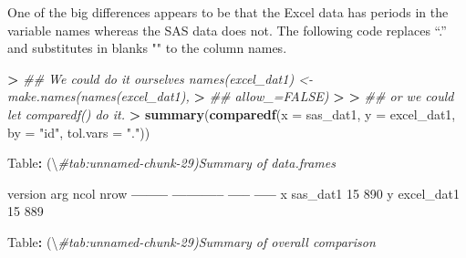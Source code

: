 \documentclass[
]{book}
\newenvironment{Shaded}{\begin{snugshade}}{\end{snugshade}}
\newcommand{\CommentTok}[1]{\textcolor[rgb]{0.56,0.35,0.01}{\textit{#1}}}
\newcommand{\DataTypeTok}[1]{\textcolor[rgb]{0.13,0.29,0.53}{#1}}
\newcommand{\DecValTok}[1]{\textcolor[rgb]{0.00,0.00,0.81}{#1}}
\newcommand{\ErrorTok}[1]{\textcolor[rgb]{0.64,0.00,0.00}{\textbf{#1}}}
\newcommand{\KeywordTok}[1]{\textcolor[rgb]{0.13,0.29,0.53}{\textbf{#1}}}
\newcommand{\NormalTok}[1]{#1}
\newcommand{\OperatorTok}[1]{\textcolor[rgb]{0.81,0.36,0.00}{\textbf{#1}}}
\newcommand{\StringTok}[1]{\textcolor[rgb]{0.31,0.60,0.02}{#1}}
\begin{document}
One of the big differences appears to be that the Excel data has periods in the variable names whereas the SAS data does not. The following code replaces ``.'' and substitutes in blanks "" to the column names.

\begin{Shaded}
\begin{Highlighting}[]
\OperatorTok{>}\StringTok{ }\CommentTok{## We could do it ourselves names(excel_dat1) <- make.names(names(excel_dat1),}
\ErrorTok{>}\StringTok{ }\CommentTok{## allow_=FALSE)}
\ErrorTok{>}\StringTok{ }
\ErrorTok{>}\StringTok{ }\CommentTok{## or we could let comparedf() do it.}
\ErrorTok{>}\StringTok{ }\KeywordTok{summary}\NormalTok{(}\KeywordTok{comparedf}\NormalTok{(}\DataTypeTok{x =}\NormalTok{ sas_dat1, }\DataTypeTok{y =}\NormalTok{ excel_dat1, }\DataTypeTok{by =} \StringTok{"id"}\NormalTok{, }\DataTypeTok{tol.vars =} \StringTok{"."}\NormalTok{))}


\NormalTok{Table}\OperatorTok{:}\StringTok{ }\NormalTok{(\textbackslash{}}\CommentTok{#tab:unnamed-chunk-29)Summary of data.frames}

\NormalTok{version   arg           ncol   nrow}
\OperatorTok{--------}\StringTok{  }\OperatorTok{-----------}\StringTok{  }\OperatorTok{-----}\StringTok{  }\OperatorTok{-----}
\NormalTok{x         sas_dat1        }\DecValTok{15}    \DecValTok{890}
\NormalTok{y         excel_dat1      }\DecValTok{15}    \DecValTok{889}



\NormalTok{Table}\OperatorTok{:}\StringTok{ }\NormalTok{(\textbackslash{}}\CommentTok{#tab:unnamed-chunk-29)Summary of overall comparison}


\end{Highlighting}
\end{Shaded}
\end{document}
